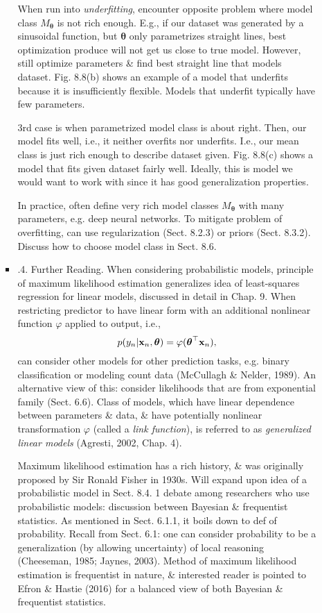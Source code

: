 \documentclass{article}
\begin{document}
\begin{itemize}
\begin{itemize}
\begin{itemize}
			When run into {\it underfitting}, encounter opposite problem where model class $M_{\boldsymbol{\theta}}$ is not rich enough. E.g., if our dataset was generated by a sinusoidal function, but $\boldsymbol{\theta}$ only parametrizes straight lines, best optimization produce will not get us close to true model. However, still optimize parameters \& find best straight line that models dataset. {\sf Fig. 8.8(b)} shows an example of a model that underfits because it is insufficiently flexible. Models that underfit typically have few parameters.
			
			3rd case is when parametrized model class is about right. Then, our model fits well, i.e., it neither overfits nor underfits. I.e., our mean class is just rich enough to describe dataset given. {\sf Fig. 8.8(c)} shows a model that fits given dataset fairly well. Ideally, this is model we would want to work with since it has good generalization properties.
			
			In practice, often define very rich model classes $M_{\boldsymbol{\theta}}$ with many parameters, e.g. deep neural networks. To mitigate problem of overfitting, can use regularization (Sect. 8.2.3) or priors (Sect. 8.3.2). Discuss how to choose model class in Sect. 8.6.
			\item {.4. Further Reading.} When considering probabilistic models, principle of maximum likelihood estimation generalizes idea of least-squares regression for linear models, discussed in detail in Chap. 9. When restricting predictor to have linear form with an additional nonlinear function $\varphi$ applied to output, i.e.,
			\begin{equation}
				p(y_n|{\bf x}_n,\boldsymbol{\theta}) = \varphi(\boldsymbol{\theta}^\top{\bf x}_n),
			\end{equation}
			can consider other models for other prediction tasks, e.g. binary classification or modeling count data (McCullagh \& Nelder, 1989). An alternative view of this: consider likelihoods that are from exponential family (Sect. 6.6). Class of models, which have linear dependence between parameters \& data, \& have potentially nonlinear transformation $\varphi$ (called a {\it link function}), is referred to as {\it generalized linear models} (Agresti, 2002, Chap. 4).
			
			Maximum likelihood estimation has a rich history, \& was originally proposed by Sir {\sc Ronald Fisher} in 1930s. Will expand upon idea of a probabilistic model in Sect. 8.4. 1 debate among researchers who use probabilistic models: discussion between Bayesian \& frequentist statistics. As mentioned in Sect. 6.1.1, it boils down to def of probability. Recall from Sect. 6.1: one can consider probability to be a generalization (by allowing uncertainty) of local reasoning (Cheeseman, 1985; Jaynes, 2003). Method of maximum likelihood estimation is frequentist in nature, \& interested reader is pointed to Efron \& Hastie (2016) for a balanced view of both Bayesian \& frequentist statistics.
			

\end{itemize}
\end{itemize}
\end{itemize}
\end{document}
